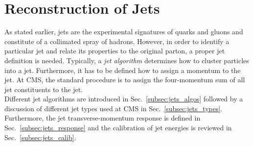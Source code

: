 \section{Reconstruction of Jets}
\label{sec:jets_reco}
As stated earlier, jets are the experimental signatures of quarks and gluons and constitute of a collimated spray of hadrons. However, in order to identify a particular jet and relate its properties to the original parton, a proper jet definition is needed. Typically, a \textit{jet algorithm} determines how to cluster particles into a jet. Furthermore, it has to be defined how to assign a momentum to the jet. At CMS, the standard procedure is to assign the four-momentum sum of all jet constituents to the jet. \\
Different jet algorithms are introduced in Sec.~\ref{subsec:jets_algos} followed by a discussion of different jet types used at CMS in Sec.~\ref{subsec:jets_types}. Furthermore, the jet transverse-momentum response is defined in Sec.~\ref{subsec:jets_response} and the calibration of jet energies is reviewed in Sec.~\ref{subsec:jets_calib}.
